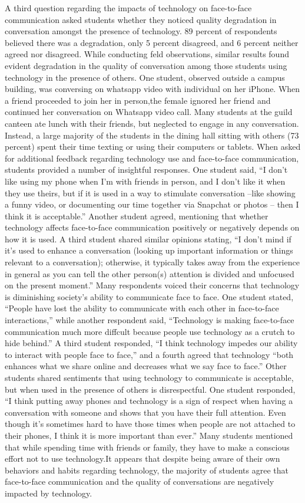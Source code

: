 \documentclass[11pt]{article} %
\begin{document}
A third question regarding the impacts of technology on face-to-face communication asked students whether they noticed quality degradation in conversation amongst the presence of technology. 89 percent of respondents believed there was a degradation, only 5 percent disagreed, and 6 percent neither agreed nor disagreed. 
While conducting feld observations, similar results found evident degradation in the quality of conversation among those students using technology in the presence of others. One student, observed outside a campus building, was conversing on whatsapp video with individual on her iPhone. When a friend proceeded to join her in person,the female ignored her friend and continued her conversation on Whatsapp video call. Many students at the guild canteen ate lunch with their friends, but neglected to engage in any conversation. Instead, a large majority of the students in the dining hall sitting with others (73 percent) spent their time texting or using their computers or 
tablets. 
When asked for additional feedback regarding technology use and face-to-face communication, students provided a number of insightful responses. One student said, “I don’t like using my phone when I’m with friends in person, and I don’t like it when they use theirs, but if it is used in a way to stimulate conversation –like showing a funny video, or documenting our time together via Snapchat or photos – then I think it is acceptable.” Another student agreed, mentioning that whether technology affects face-to-face communication positively or negatively depends on how it is used. A third student shared similar opinions stating, “I don’t mind if it’s used to enhance a conversation (looking up important information or things relevant to a conversation); otherwise, it typically takes away from the experience in general as you can tell the other person(s) attention is divided and unfocused on the present moment.” 
Many respondents voiced their concerns that technology is diminishing society’s ability to communicate face to face. One student stated, “People have lost the ability to communicate with each other in face-to-face interactions,” while another respondent said, “Technology is making face-to-face communication much more diffcult because people use technology as a crutch to hide behind.” 
A third student responded, “I think technology impedes our ability to interact with people face to face,” and a fourth agreed that technology “both enhances what we share online and decreases what we say face to face.”
Other students shared sentiments that using technology to communicate is acceptable, but when used in the presence of others is disrespectful. One student responded, “I think putting away phones and technology is a sign of respect when having a conversation with someone and shows that you have their full attention. Even though it’s sometimes hard to have those times when people are not attached to their phones, I think it is more important than ever.” Many students mentioned that while spending time with friends or family, they have to make a conscious effort not to use technology.It appears that despite being aware of their own behaviors and habits regarding technology, the majority of students agree that face-to-face communication and the quality of conversations are negatively impacted by technology.
\end{document}
